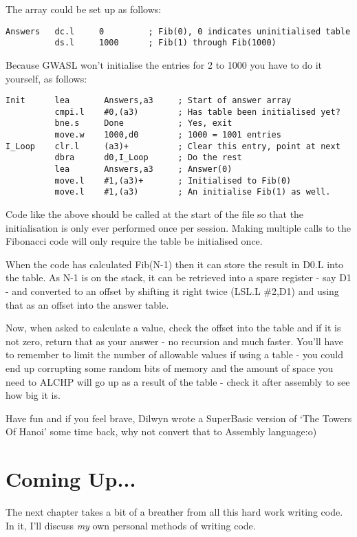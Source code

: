 The array could be set up as follows:

\begin{lstlisting}[firstnumber=1,caption={Improving the Fibonacci Code - Answers Array}]
Answers   dc.l     0         ; Fib(0), 0 indicates uninitialised table
          ds.l     1000      ; Fib(1) through Fib(1000)
\end{lstlisting}

Because GWASL won't initialise the entries for 2 to 1000 you have
      to do it yourself, as follows:

\begin{lstlisting}[firstnumber=last,caption={Improving the Fibonacci Code - Array Initialisation}]
Init      lea       Answers,a3     ; Start of answer array
          cmpi.l    #0,(a3)        ; Has table been initialised yet?
          bne.s     Done           ; Yes, exit
          move.w    1000,d0        ; 1000 = 1001 entries
I_Loop    clr.l     (a3)+          ; Clear this entry, point at next
          dbra      d0,I_Loop      ; Do the rest
          lea       Answers,a3     ; Answer(0)
          move.l    #1,(a3)+       ; Initialised to Fib(0)
          move.l    #1,(a3)        ; An initialise Fib(1) as well.
\end{lstlisting}

Code like the above should be called at the start of the file so
      that the initialisation is only ever performed once per session. Making
      multiple calls to the Fibonacci code will only require the table be
      initialised once.

When the code has calculated Fib(N-{}1) then it can store the result
      in D0.L into the table. As N-{}1 is on the stack, it can be retrieved into
      a spare register -{} say D1 -{} and converted to an offset by shifting it
      right twice (LSL.L \#2,D1) and using that as an offset into the answer
      table.

Now, when asked to calculate a value, check the offset into the
      table and if it is not zero, return that as your answer -{} no recursion
      and much faster. You'll have to remember to limit the number of
      allowable values if using a table -{} you could end up corrupting some
      random bits of memory and the amount of space you need to ALCHP will go
      up as a result of the table -{} check it after assembly to see how big it
      is.

Have fun and if you feel brave, Dilwyn wrote a SuperBasic version
      of `The Towers Of Hanoi' some time back, why not convert that to
      Assembly language:o)

\section{Coming Up...}
\label{ch13-the-end}%

The next chapter takes a bit of a breather from all this hard work
    writing code. In it, I'll discuss \emph{my} own personal
    methods of writing code.

